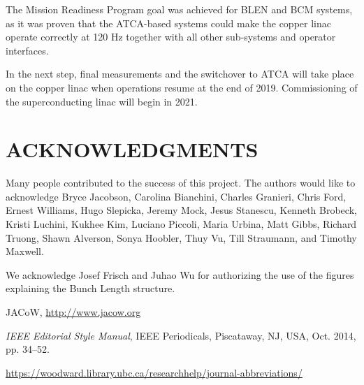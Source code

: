 \documentclass[letter,
        biblatex,   %
        keeplastbox,  %
        ]{jacow}
\begin{document}
The Mission Readiness Program goal was achieved for BLEN and BCM systems, as it was proven that the ATCA-based systems could make the copper linac operate correctly at 120 Hz together with all other sub-systems and operator interfaces.

In the next step, final measurements and the switchover to ATCA will take place on the copper linac when operations resume at the end of 2019. Commissioning of the superconducting linac will begin in 2021.

\section{ACKNOWLEDGMENTS}
Many people contributed to the success of this project. The authors would like to acknowledge Bryce Jacobson, Carolina Bianchini, Charles Granieri, Chris Ford, Ernest Williams, Hugo Slepicka, Jeremy Mock, Jesus Stanescu, Kenneth Brobeck, Kristi Luchini, Kukhee Kim, Luciano Piccoli, Maria Urbina, Matt Gibbs, Richard Truong, Shawn Alverson, Sonya Hoobler, Thuy Vu, Till Straumann, and Timothy Maxwell.

We acknowledge Josef Frisch and Juhao Wu for authorizing the use of the figures explaining the Bunch Length structure.

%
%
%
	{\printbibliography}%
	{%
	
	\begin{thebibliography}{9} %
	
		JACoW,
		\url{http://www.jacow.org}
	
		\textit{IEEE Editorial Style Manual},
		IEEE Periodicals, Piscataway,
		NJ, USA, Oct. 2014, pp. 34--52.

	\url{https://woodward.library.ubc.ca/researchhelp/journal-abbreviations/}

	\end{thebibliography}
} %
\end{document}
